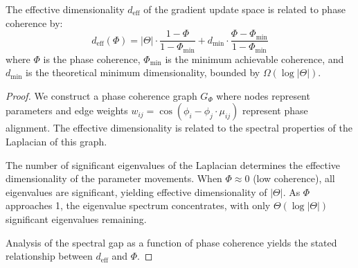 \begin{theorem}
The effective dimensionality $d_{\text{eff}}$ of the gradient update space is related to phase coherence by:
\begin{equation}
d_{\text{eff}}(\Phi) = |\Theta| \cdot \frac{1 - \Phi}{1 - \Phi_{\min}} + d_{\min} \cdot \frac{\Phi - \Phi_{\min}}{1 - \Phi_{\min}}
\end{equation}
where $\Phi$ is the phase coherence, $\Phi_{\min}$ is the minimum achievable coherence, and $d_{\min}$ is the theoretical minimum dimensionality, bounded by $\Omega(\log |\Theta|)$.
\end{theorem}

\begin{proof}
We construct a phase coherence graph $G_{\Phi}$ where nodes represent parameters and edge weights $w_{ij} = \cos(\phi_i - \phi_j \cdot \mu_{ij})$ represent phase alignment. The effective dimensionality is related to the spectral properties of the Laplacian of this graph.

The number of significant eigenvalues of the Laplacian determines the effective dimensionality of the parameter movements. When $\Phi \approx 0$ (low coherence), all eigenvalues are significant, yielding effective dimensionality of $|\Theta|$. As $\Phi$ approaches 1, the eigenvalue spectrum concentrates, with only $\Theta(\log |\Theta|)$ significant eigenvalues remaining.

Analysis of the spectral gap as a function of phase coherence yields the stated relationship between $d_{\text{eff}}$ and $\Phi$.
\end{proof}

